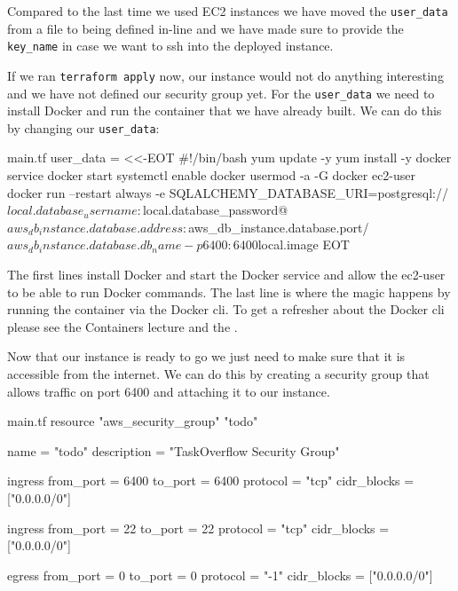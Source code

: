 \documentclass{csse4400}
\begin{document}
Compared to the last time we used EC2 instances we have moved the \texttt{user\_data} from a file to being defined in-line and we have made sure to provide the \texttt{key\_name} in case we want to ssh into the deployed instance.

If we ran \texttt{terraform apply} now, our instance would not do anything interesting and we have not defined our security group yet. For the \texttt{user\_data} we need to install Docker and run the container that we have already built. We can do this by changing our \texttt{user\_data}:

\begin{code}[language=terraform,numbers=none]{main.tf}
  user_data                   = <<-EOT
  #!/bin/bash
  yum update -y
  yum install -y docker
  service docker start
  systemctl enable docker
  usermod -a -G docker ec2-user 
  docker run --restart always -e SQLALCHEMY_DATABASE_URI=postgresql://${local.database_username}:${local.database_password}@${aws_db_instance.database.address}:${aws_db_instance.database.port}/${aws_db_instance.database.db_name} -p 6400:6400 ${local.image}
  EOT
\end{code}

The first lines install Docker and start the Docker service and allow the ec2-user to be able to run Docker commands. The last line is where the magic happens by running the container via the Docker cli. To get a refresher about the Docker cli please see the Containers lecture \cite{container-slides} and the . 


Now that our instance is ready to go we just need to make sure that it is accessible from the internet. We can do this by creating a security group that allows traffic on port 6400 and attaching it to our instance.

\begin{code}[language=terraform,numbers=none]{main.tf}
  resource "aws_security_group" "todo" {
    name = "todo"
    description = "TaskOverflow Security Group"
  
    ingress {
      from_port = 6400
      to_port = 6400
      protocol = "tcp"
      cidr_blocks = ["0.0.0.0/0"]
    }
  
    ingress {
      from_port = 22
      to_port = 22
      protocol = "tcp"
      cidr_blocks = ["0.0.0.0/0"]
    }
  
    egress {
      from_port = 0
      to_port = 0
      protocol = "-1"
      cidr_blocks = ["0.0.0.0/0"]
    }
  }
\end{code}
\end{document}
